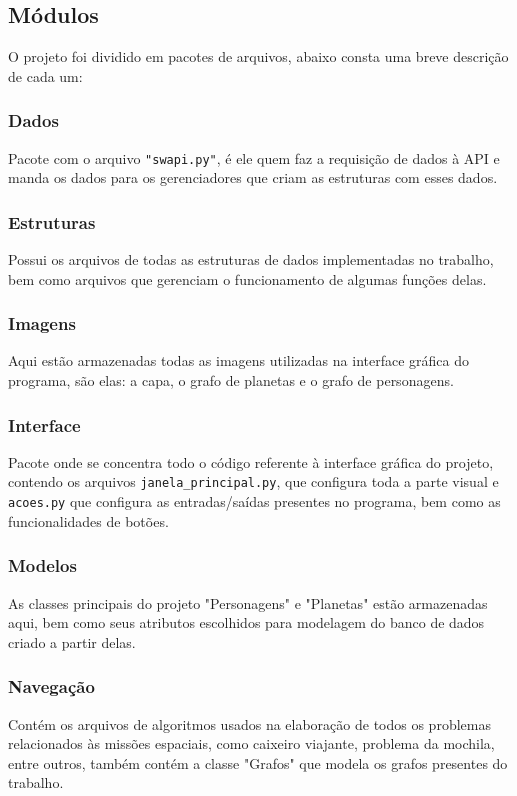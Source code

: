 \documentclass[12pt,a4paper]{article}
\begin{document}
\subsection{Módulos}
O projeto foi dividido em pacotes de arquivos, abaixo consta uma breve descrição de cada um:

\subsubsection{Dados}
Pacote com o arquivo \texttt{"swapi.py"}, é ele quem faz a requisição de dados à API e manda os dados para os gerenciadores que criam as estruturas com esses dados.

\subsubsection{Estruturas}
Possui os arquivos de todas as estruturas de dados implementadas no trabalho, bem como arquivos que gerenciam o funcionamento de algumas funções delas.

\subsubsection{Imagens}
Aqui estão armazenadas todas as imagens utilizadas na interface gráfica do programa, são elas: a capa, o grafo de planetas e o grafo de personagens.

\subsubsection{Interface}
Pacote onde se concentra todo o código referente à interface gráfica do projeto, contendo os arquivos \texttt{janela\_principal.py}, que configura toda a parte visual e \texttt{acoes.py} que configura as entradas/saídas presentes no programa, bem como as funcionalidades de botões.

\subsubsection{Modelos}
As classes principais do projeto "Personagens" e "Planetas" estão armazenadas aqui, bem como seus atributos escolhidos para modelagem do banco de dados criado a partir delas.

\subsubsection{Navegação}
Contém os arquivos de algoritmos usados na elaboração de todos os problemas relacionados às missões espaciais, como caixeiro viajante, problema da mochila, entre outros, também contém a classe "Grafos" que modela os grafos presentes do trabalho.
\end{document}
